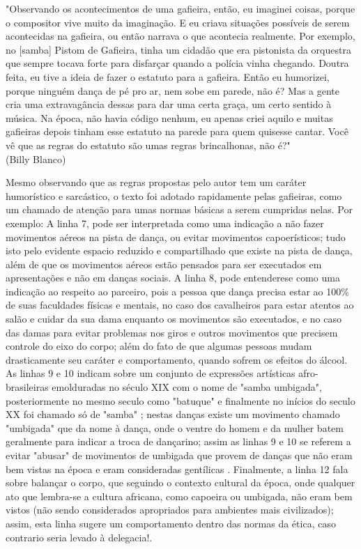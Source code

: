 \begin{tcolorbox}[colback=lowgray,colframe=lowgray]%
"Observando os acontecimentos de uma gafieira, então, eu imaginei
coisas, porque o compositor vive muito da imaginação. E eu criava situações 
possíveis de serem acontecidas na gafieira, ou então narrava o que
acontecia realmente. Por exemplo, no [samba] Pistom de Gafieira, tinha
um cidadão que era pistonista da orquestra que sempre tocava forte para
disfarçar quando a polícia vinha chegando. Doutra feita, eu tive a ideia
de fazer o estatuto para a gafieira. Então eu humorizei, porque ninguém
dança de pé pro ar, nem sobe em parede, não é? Mas a gente cria uma
extravagância dessas para dar uma certa graça, um certo sentido à música.
Na época, não havia código nenhum, eu apenas criei aquilo e muitas gafieiras 
depois tinham esse estatuto na parede para quem quisesse cantar.
Você vê que as regras do estatuto são umas regras brincalhonas, não é?" 
~\\
(Billy Blanco)
\end{tcolorbox}

Mesmo observando que as regras propostas pelo autor tem um caráter humorístico e sarcástico,
o texto foi adotado rapidamente pelas gafieiras, como um chamado de atenção para umas
normas básicas a serem cumpridas nelas. Por exemplo: 
A linha 7, pode ser interpretada como uma indicação a 
não fazer movimentos aéreos na pista de dança,
ou  evitar movimentos capoerísticos; tudo isto
pelo evidente espacio reduzido e compartilhado que existe na pista de dança, 
além de que os movimentos aéreos estão pensados para ser
executados em apresentações e não em danças sociais. 
A linha 8, pode entenderese como uma indicação 
ao respeito ao parceiro, pois a pessoa que dança precisa
estar ao 100$\%$ de suas faculdades físicas e mentais, no caso dos cavalheiros para estar atentos ao salão e cuidar da sua dama enquanto os movimentos são executados, 
e no caso das damas para evitar problemas
nos giros e outros movimentos que precisem  controle do eixo do corpo; 
além do fato de que algumas pessoas mudam drasticamente seu 
caráter e comportamento, quando  sofrem os efeitos do álcool.
As linhas 9 e 10 indicam sobre um conjunto de expressões artísticas 
afro-brasileiras emolduradas no século XIX com o nome de "samba umbigada",
posteriormente no mesmo seculo como "batuque" e finalmente no inícios do seculo XX foi chamado só 
de "samba" \cite[pp. 47]{diniz2008almanaque} \cite[pp. 85]{sandroni2001feitico}; nestas danças existe
um movimento chamado "umbigada" \cite{da2015historia} que da nome à dança, onde o ventre do homem e da mulher batem geralmente para indicar
a troca de dançarino; assim as linhas 9 e 10 se referem a
 evitar "abusar" de movimentos de umbigada que provem de danças que não eram bem vistas na época e eram consideradas gentílicas \cite[pp. 85]{sandroni2001feitico}.
Finalmente,
a linha 12 fala sobre balançar o corpo, que seguindo o contexto cultural da 
época, onde qualquer ato que lembra-se a cultura africana, como capoeira ou umbigada, 
não eram bem vistos (não sendo considerados apropriados para ambientes mais civilizados); 
assim, esta linha sugere um comportamento dentro das normas da ética,
caso contrario seria levado à delegacia!.


